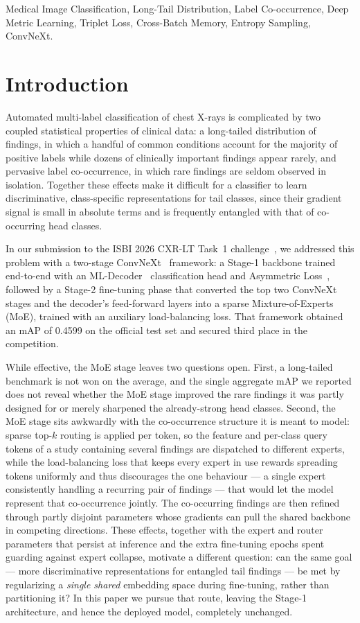 \documentclass[conference]{IEEEtran}
\begin{document}
\begin{IEEEkeywords}
Medical Image Classification, Long-Tail Distribution, Label Co-occurrence, Deep Metric Learning, Triplet Loss, Cross-Batch Memory, Entropy Sampling, ConvNeXt.
\end{IEEEkeywords}

\section{Introduction}
Automated multi-label classification of chest X-rays is complicated by two coupled statistical properties of clinical data: a long-tailed distribution of findings, in which a handful of common conditions account for the majority of positive labels while dozens of clinically important findings appear rarely, and pervasive label co-occurrence, in which rare findings are seldom observed in isolation. Together these effects make it difficult for a classifier to learn discriminative, class-specific representations for tail classes, since their gradient signal is small in absolute terms and is frequently entangled with that of co-occurring head classes.

In our submission to the ISBI 2026 CXR-LT Task~1 challenge~\cite{b12}, we addressed this problem with a two-stage ConvNeXt~\cite{b1} framework: a Stage-1 backbone trained end-to-end with an ML-Decoder~\cite{b2} classification head and Asymmetric Loss~\cite{b3}, followed by a Stage-2 fine-tuning phase that converted the top two ConvNeXt stages and the decoder's feed-forward layers into a sparse Mixture-of-Experts (MoE), trained with an auxiliary load-balancing loss. That framework obtained an mAP of 0.4599 on the official test set and secured third place in the competition.

While effective, the MoE stage leaves two questions open. First, a long-tailed benchmark is not won on the average, and the single aggregate mAP we reported does not reveal whether the MoE stage improved the rare findings it was partly designed for or merely sharpened the already-strong head classes. Second, the MoE stage sits awkwardly with the co-occurrence structure it is meant to model: sparse top-$k$ routing is applied per token, so the feature and per-class query tokens of a study containing several findings are dispatched to different experts, while the load-balancing loss that keeps every expert in use rewards spreading tokens uniformly and thus discourages the one behaviour --- a single expert consistently handling a recurring pair of findings --- that would let the model represent that co-occurrence jointly. The co-occurring findings are then refined through partly disjoint parameters whose gradients can pull the shared backbone in competing directions. These effects, together with the expert and router parameters that persist at inference and the extra fine-tuning epochs spent guarding against expert collapse, motivate a different question: can the same goal --- more discriminative representations for entangled tail findings --- be met by regularizing a \emph{single shared} embedding space during fine-tuning, rather than partitioning it? In this paper we pursue that route, leaving the Stage-1 architecture, and hence the deployed model, completely unchanged.
\end{document}
